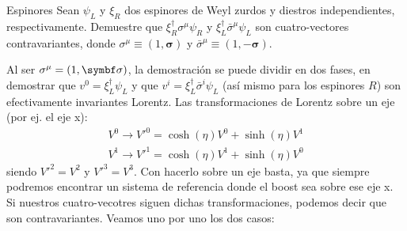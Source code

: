 

\begin{Ejercicio}{Espinores}
Sean $\psi_L$ y $\xi_R$ dos espinores de Weyl zurdos y diestros independientes, respectivamente.  Demuestre que $\xi_R^\dagger \sigma^\mu \psi_R$ y $\xi_L^\dagger \bar{\sigma}^\mu \psi_L$ son cuatro-vectores contravariantes,  donde $\sigma^\mu \equiv (1,\symbf{\sigma})$ y $\bar{\sigma}^\mu \equiv (1,-\symbf{\sigma})$.
\end{Ejercicio}

Al ser $\sigma^\mu = (1,\sigman)$, la demostración se puede dividir en dos fases, en demostrar que $v^0=\xi_L^\dagger \psi_L$ y que $v^i =\xi_L^\dagger  \bar{\sigma}^i \psi_L$ (así mismo para los espinores $R$) son efectivamente invariantes Lorentz. Las transformaciones de Lorentz sobre un eje (por ej. el eje x):
\begin{eqnarray}
    V^0 \to V'^0 = \cosh (\eta) V^0 + \sinh (\eta)  V^{1}\\ 
    V^1 \to V'^1 = \cosh (\eta) V^1 + \sinh (\eta)  V^{0}
\end{eqnarray}
siendo $V'^2=V^2$ y $V'^3=V^3$. Con hacerlo sobre un eje basta, ya que siempre podremos encontrar un sistema de referencia donde el boost sea sobre ese eje x. Si nuestros cuatro-vecotres siguen dichas transformaciones, podemos decir que son contravariantes. Veamos uno por uno los dos casos: 

